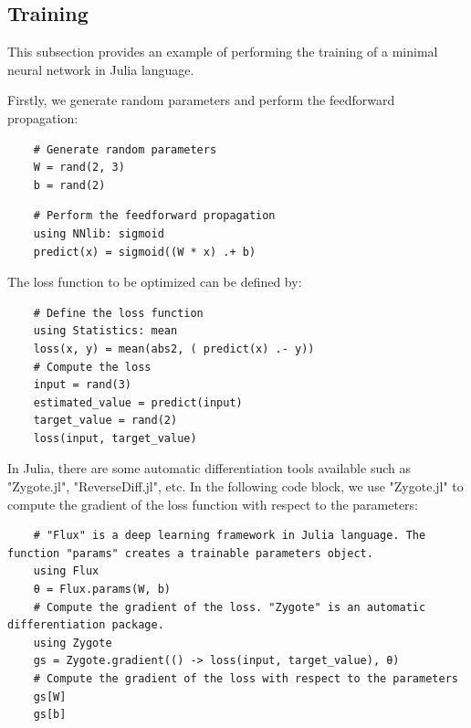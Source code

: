 \documentclass[
	parskip, 			   %
	twoside, 			   %
	DIV=14, 			   %
	BCOR=15.0mm, 		   %
	headsepline, 		   %
	open=right, 		   %
	captions=tableheading, %
	bibliography=totoc,    %
	numbers=noenddot       %
]{scrreprt}
\begin{document}
\subsection{Training}
This subsection provides an example of performing the training of a minimal neural network in Julia language.

Firstly, we generate random parameters and perform the feedforward propagation:

\begin{verbatim}
    # Generate random parameters
    W = rand(2, 3)
    b = rand(2)
\end{verbatim}

\begin{verbatim}
    # Perform the feedforward propagation
    using NNlib: sigmoid
    predict(x) = sigmoid((W * x) .+ b)
\end{verbatim}

The loss function to be optimized can be defined by:

\begin{verbatim}
    # Define the loss function
    using Statistics: mean
    loss(x, y) = mean(abs2, ( predict(x) .- y))
    # Compute the loss
    input = rand(3)
    estimated_value = predict(input)
    target_value = rand(2)
    loss(input, target_value)
\end{verbatim}

In Julia, there are some automatic differentiation tools available such as "Zygote.jl", "ReverseDiff.jl", etc. In the following code block, we use "Zygote.jl" \cite{Zygote.jl-2018} to compute the gradient of the loss function with respect to the parameters:

\begin{verbatim}
    # "Flux" is a deep learning framework in Julia language. The function "params" creates a trainable parameters object.
    using Flux
    θ = Flux.params(W, b)
    # Compute the gradient of the loss. "Zygote" is an automatic differentiation package.
    using Zygote
    gs = Zygote.gradient(() -> loss(input, target_value), θ)
    # Compute the gradient of the loss with respect to the parameters
    gs[W]
    gs[b]
\end{verbatim}
\end{document}
